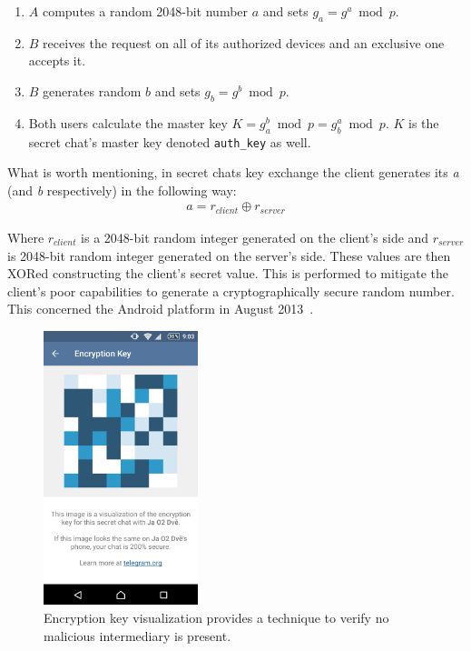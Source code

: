 \documentclass[thesis=M,english]{FITthesis}[2012/10/20]
\begin{document}
\begin{enumerate}
	\item $A$ computes a random 2048-bit number $a$ and sets $g_a = g^a \bmod p$.\label{enum:DH-a}
	\item $B$ receives the request on all of its authorized devices and an exclusive one accepts it.
	\item $B$ generates random $b$ and sets $g_b = g^b \bmod p$\label{enum:DH-b}.
	\item Both users calculate the master key $K = g_a^b \bmod p = g_b^a \bmod p$. $K$ is the secret chat's master key denoted \texttt{auth\_key} as well.
\end{enumerate}

What is worth mentioning, in secret chats key exchange the client generates its \emph{a} (and \emph{b} respectively) in the following way:
\begin{gather*}
a = r_{client} \oplus r_{server}
\end{gather*}

Where $r_{client}$ is a 2048-bit random integer generated on the client's side and $r_{server}$ is 2048-bit random integer generated on the server's side. These values are then XORed constructing the client's secret value. This is performed to mitigate the client's poor capabilities to generate a cryptographically secure random number. This concerned the Android platform in August 2013~\cite{telegram-android-securerandom}.

\begin{figure}[htb]
	\centering
	\includegraphics[width=0.4\textwidth]{telegram-keybox.png}
	\caption[Encryption key visualization]{Encryption key visualization provides a technique to verify no malicious intermediary is present.}
	\label{img:telegram-keybox}
\end{figure}
\end{document}
